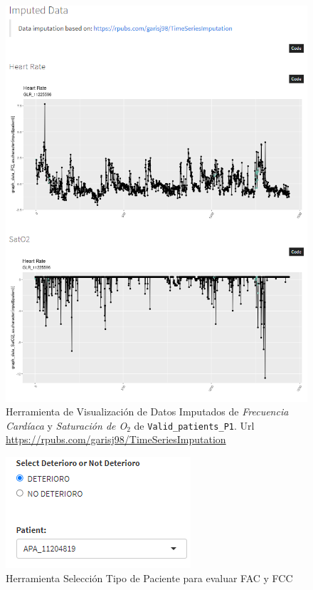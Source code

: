 \begin{figure}[H]
    \centering
    \includegraphics[scale = 1]{./img/graphic2.png}
    \caption{Herramienta de Visualización de Datos Imputados de \textit{Frecuencia Cardíaca} y \textit{Saturación de O$_2$} de \texttt{Valid\_patients\_P1}. Url \url{https://rpubs.com/garisj98/TimeSeriesImputation}}\label{fig:visualizacion-datos-2}
\end{figure}

\begin{figure}[H]
    \centering
    \includegraphics[scale = 1.25]{./img/graphic3.png}
    \caption{Herramienta Selección Tipo de Paciente para evaluar FAC y FCC}\label{fig:visualizacion-datos-3}
\end{figure}

